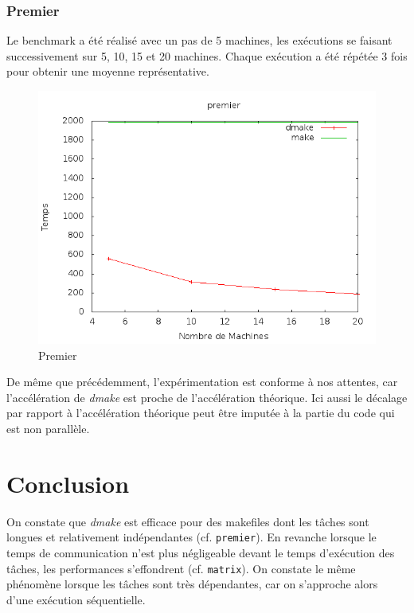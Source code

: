 \documentclass[a4paper,12pt,twoside]{article}
\begin{document}
\subsubsection{Premier}

Le benchmark a été réalisé avec un pas de 5 machines, les exécutions
se faisant successivement sur 5, 10, 15 et 20 machines. Chaque
exécution a été répétée 3 fois pour obtenir une moyenne
représentative.

\begin{figure}[H]
  \centering
  \includegraphics[scale=0.5]{benchmark_premier_01.png}
  \caption{Premier}
  \label{fig:premier}
\end{figure}

De même que précédemment, l'expérimentation est conforme à nos attentes, car
l'accélération de \emph{dmake} est proche de l'accélération
théorique. Ici aussi le décalage par rapport à l'accélération théorique peut
être imputée à la partie du code qui est non parallèle. 

\section*{Conclusion}
On constate que \emph{dmake} est efficace pour des makefiles dont les
tâches sont longues et relativement indépendantes
(cf. \texttt{premier}). En revanche lorsque le temps de communication
n'est plus négligeable devant le temps d'exécution des tâches, les
performances s'effondrent (cf. \texttt{matrix}). On constate le même phénomène lorsque les
tâches sont très dépendantes, car on s'approche alors d'une exécution séquentielle.
\end{document}
